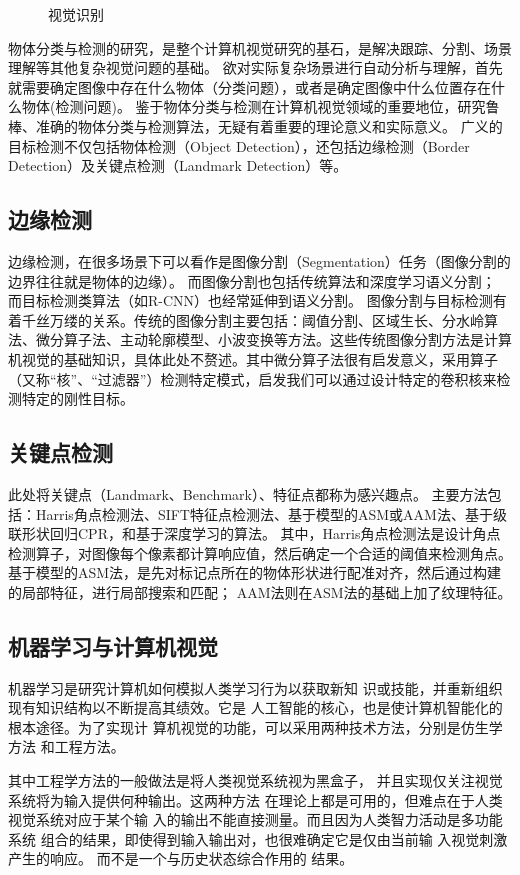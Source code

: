 \documentclass[UTF8,a4paper,10pt,nocolorlinks]{ctexart}
\begin{document}
\begin{multicols}{2}
\begin{figure}[htpb]
{            }    
            \caption{视觉识别}%
            \label{fig1}
        \end{figure}
        物体分类与检测的研究，是整个计算机视觉研究的基石，是解决跟踪、分割、场景理解等其他复杂视觉问题的基础。
        欲对实际复杂场景进行自动分析与理解，首先就需要确定图像中存在什么物体（分类问题），或者是确定图像中什么位置存在什么物体(检测问题)。
        鉴于物体分类与检测在计算机视觉领域的重要地位，研究鲁棒、准确的物体分类与检测算法，无疑有着重要的理论意义和实际意义。
        广义的目标检测不仅包括物体检测（Object Detection），还包括边缘检测（Border Detection）及关键点检测（Landmark Detection）等。
        \subsection{边缘检测}
        边缘检测，在很多场景下可以看作是图像分割（Segmentation）任务（图像分割的边界往往就是物体的边缘）。
        而图像分割也包括传统算法和深度学习语义分割；
        而目标检测类算法（如R-CNN）也经常延伸到语义分割。
        图像分割与目标检测有着千丝万缕的关系。传统的图像分割主要包括：阈值分割、区域生长、分水岭算法、微分算子法、主动轮廓模型、小波变换等方法。这些传统图像分割方法是计算机视觉的基础知识，具体此处不赘述。其中微分算子法很有启发意义，采用算子（又称“核”、“过滤器”）检测特定模式，启发我们可以通过设计特定的卷积核来检测特定的刚性目标。
        
        \subsection{关键点检测}
        此处将关键点（Landmark、Benchmark）、特征点都称为感兴趣点。
        主要方法包括：Harris角点检测法、SIFT特征点检测法、基于模型的ASM或AAM法、基于级联形状回归CPR，和基于深度学习的算法。
        其中，Harris角点检测法是设计角点检测算子，对图像每个像素都计算响应值，然后确定一个合适的阈值来检测角点。
        基于模型的ASM法，是先对标记点所在的物体形状进行配准对齐，然后通过构建的局部特征，进行局部搜索和匹配；
        AAM法则在ASM法的基础上加了纹理特征。

        \subsection{机器学习与计算机视觉}
        机器学习是研究计算机如何模拟人类学习行为以获取新知
识或技能，并重新组织现有知识结构以不断提高其绩效。它是
人工智能的核心，也是使计算机智能化的根本途径。为了实现计
算机视觉的功能，可以采用两种技术方法，分别是仿生学方法
和工程方法。\par
其中工程学方法的一般做法是将人类视觉系统视为黑盒子，
并且实现仅关注视觉系统将为输入提供何种输出。这两种方法
在理论上都是可用的，但难点在于人类视觉系统对应于某个输
入的输出不能直接测量。而且因为人类智力活动是多功能系统
组合的结果，即使得到输入输出对，也很难确定它是仅由当前输
入视觉刺激产生的响应。 而不是一个与历史状态综合作用的
结果。


\end{multicols}
\end{document}
